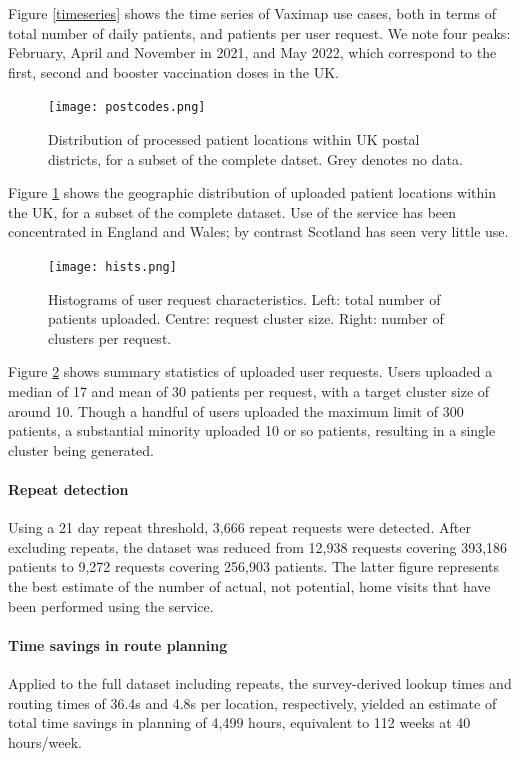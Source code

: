 \documentclass{article}
\begin{document}
Figure \ref{timeseries} shows the time series of Vaximap use cases, both in terms of total number of daily patients, and patients per user request. We note four peaks: February, April and November in 2021, and May 2022, which correspond to the first, second and booster vaccination doses in the UK.

\begin{figure}[H]
\centering
\texttt{[image: postcodes.png]}
\caption{Distribution of processed patient locations within UK postal districts, for a subset of the complete datset. Grey denotes no data.}
\label{uk_overview}
\end{figure}

Figure \ref{uk_overview} shows the geographic distribution of uploaded patient locations within the UK, for a subset of the complete dataset. Use of the service has been concentrated in England and Wales; by contrast Scotland has seen very little use.  

\begin{figure}[H]
\centering
\texttt{[image: hists.png]}
\caption{Histograms of user request characteristics. Left: total number of patients uploaded. Centre: request cluster size. Right: number of clusters per request.}
\label{hists}
\end{figure}

Figure \ref{hists} shows summary statistics of uploaded user requests. Users uploaded a median of 17 and mean of 30 patients per request, with a target cluster size of around 10. Though a handful of users uploaded the maximum limit of 300 patients, a substantial minority uploaded 10 or so patients, resulting in a single cluster being generated. 

\paragraph{Repeat detection}
Using a 21 day repeat threshold, 3,666 repeat requests were detected. After excluding repeats, the dataset was reduced from 12,938 requests covering 393,186 patients to 9,272 requests covering 256,903 patients. The latter figure represents the best estimate of the number of actual, not potential, home visits that have been performed using the service. 

\paragraph{Time savings in route planning}
Applied to the full dataset including repeats, the survey-derived lookup times and routing times of 36.4s and 4.8s per location, respectively, yielded an estimate of total time savings in planning of 4,499 hours, equivalent to 112 weeks at 40 hours/week. 
\end{document}
